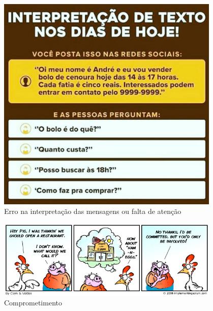 \begin{figure}
    \centering
	\includegraphics[width=0.95\textwidth]{erros/vendo_bolo_cenoura.jpg}
    \caption{Erro na interpretação das mensagens ou falta de atenção}
    \label{fig:vendo_bolo_cenoura}
\end{figure}



\begin{figure}
    \centering
	\includegraphics[width=0.95\textwidth]{erros/060911-scrumtoon.jpg}
    \caption{Comprometimento}
    \label{fig:scrum}
\end{figure}

